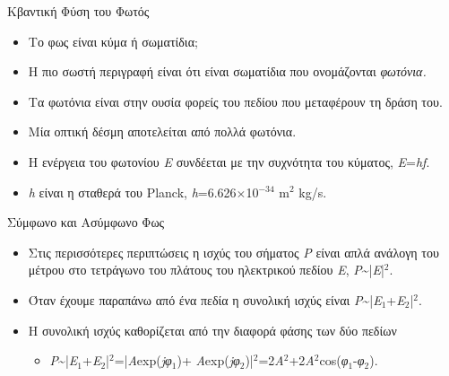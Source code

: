 \documentclass[11pt,aspectratio=169]{beamer}
\begin{document}
\begin{frame}[t]{Κβαντική Φύση του Φωτός}
\begin{itemize}
\item Το φως είναι κύμα ή σωματίδια;
\item Η πιο σωστή περιγραφή είναι ότι είναι σωματίδια που ονομάζονται \textit{φωτόνια.}
\item Τα φωτόνια είναι στην ουσία φορείς του πεδίου που μεταφέρουν τη δράση του.
\item Μία οπτική δέσμη αποτελείται από πολλά φωτόνια.
\item Η ενέργεια του φωτονίου \textit{E} συνδέεται με την συχνότητα του κύματος, \textit{Ε}=\textit{hf}.
\item \textit{h} είναι η σταθερά του Planck, \textit{h}=6.626\ensuremath{\times}10$^{-34}$ m$^{\text{2}}$ kg/s.
\end{itemize}
\end{frame}

\begin{frame}[shrink=20,t]{Σύμφωνο και Ασύμφωνο Φως}
\begin{itemize}
\item Στις περισσότερες περιπτώσεις η ισχύς του σήματος \textit{P} είναι απλά ανάλογη του μέτρου στο τετράγωνο του πλάτους του ηλεκτρικού πεδίου \textit{Ε}, \textit{P}\textasciitilde{}|\textit{E}|$^{\text{2}}$.
\item Όταν έχουμε παραπάνω από ένα πεδία η συνολική ισχύς είναι \textit{P}\textasciitilde{}|\textit{E}$_{\text{1}}$+\textit{E}$_{\text{2}}$|$^{\text{2}}$.
\item H συνολική ισχύς καθορίζεται από την διαφορά φάσης των δύο πεδίων
\begin{itemize}
\item \textit{P}\textasciitilde{}|\textit{E}$_{\text{1}}$+\textit{E}$_{\text{2}}$|$^{\text{2}}$=|\textit{Α}exp(\textit{j}\textit{φ}$_{\text{1}}$)+ \textit{Α}exp(\textit{j}\textit{φ}$_{\text{2}}$)|$^{\text{2}}$=2\textit{A}$^{\text{2}}$+2\textit{A}$^{\text{2}}$cos(\textit{φ}$_{\text{1}}$-\textit{φ}$_{\text{2}}$).
\end{itemize}
\end{itemize}
\end{frame}
\end{document}
